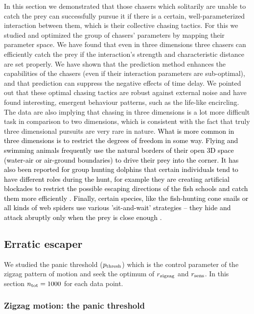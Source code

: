\documentclass[12pt,a4paper,final]{iopart}
\newcommand{\revision}{\textcolor{black}}
\begin{document}
In this section we demonstrated that those chasers which solitarily are unable to catch the prey can successfully pursue it if there is a certain, well-parameterized interaction between them, which is their collective chasing tactics. For this we studied and optimized the group of chasers' parameters by mapping their parameter space. We have found that even in three dimensions three chasers can efficiently catch the prey if the interaction's strength and characteristic distance are set properly. We have shown that the prediction method enhances the capabilities of the chasers (even if their interaction parameters are sub-optimal), and that prediction can suppress the negative effects of time delay. We pointed out that these optimal chasing tactics are robust against external noise and have found interesting, emergent behaviour patterns, such as the life-like encircling. The data are also implying that chasing in three dimensions is a lot more difficult task in comparison to two dimensions, which is consistent with the fact that truly three dimensional pursuits are very rare in nature. \revision{What is more common in three dimensions is to restrict the degrees of freedom in some way. Flying and swimming animals frequently use the natural borders of their open 3D space (water-air or air-ground boundaries) to drive their prey into the corner. It has also been reported for group hunting dolphins that certain individuals tend to have different roles during the hunt, for example they are creating artificial blockades to restrict the possible escaping directions of the fish schools and catch them more efficiently \cite{norris1988cooperative,gazda2005division}. Finally, certain species, like the fish-hunting cone snails or all kinds of web spiders use various 'sit-and-wait' strategies -- they hide and attack abruptly only when the prey is close enough \cite{terlau1996strategy, kim2005cooperative}.}



\subsection{Erratic escaper}

We studied the panic threshold ($p_{\rm thresh}$) which is the control parameter of the zigzag pattern of motion and seek the optimum of $r_{\rm zigzag}$ and $r_{\rm sens}$. In this section $n_{\rm tot} = 1000$ for each data point.

\subsubsection{Zigzag motion: the panic threshold }
\end{document}
